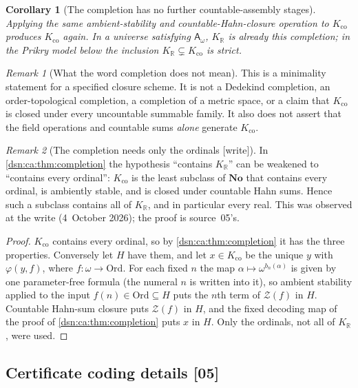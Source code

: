 \documentclass[11pt,a4paper]{article}
\numberwithin{equation}{section}
\newtheorem{corollary}[corollary]{Corollary}
\theoremstyle{definition}
\theoremstyle{remark}
\newtheorem{remark}[remark]{Remark}
\newcommand{\No}{\mathbf{No}}
\newcommand{\Ord}{\mathrm{Ord}}
\newcommand{\R}{\mathbb R}
\newcommand{\src}[1]{\textup{\textsf{\small[#1]}}}
\newcommand{\writetag}{\textup{\textsf{\small[write]}}}
\newcommand{\KR}{K_{\R}}
\newcommand{\Kco}{K_{\mathrm{co}}}
\newcommand{\Asm}{\mathsf A_{\omega}}
\newcommand{\Zc}{\mathcal Z}
\begin{document}
\begin{corollary}[The completion has no further countable-assembly stages]
Applying the same ambient-stability and countable-Hahn-closure operation
to $\Kco$ produces $\Kco$ again. In a universe satisfying $\Asm$,
$\KR$ is already this completion; in the Prikry model below the
inclusion $\KR\subsetneq\Kco$ is strict.
\end{corollary}

\begin{remark}[What the word completion does not mean]
This is a minimality statement for a specified closure scheme. It is
not a Dedekind completion, an order-topological completion, a completion
of a metric space, or a claim that $\Kco$ is closed under every
uncountable summable family. It also does not assert that the field
operations and countable sums \emph{alone} generate $\Kco$.
\end{remark}

\begin{remark}[The completion needs only the ordinals \writetag]
\label{dsn:ca:rem:ordsuffice}
In \cref{dsn:ca:thm:completion} the hypothesis ``contains $\KR$'' can be
weakened to ``contains every ordinal'': $\Kco$ is the least subclass of $\No$
that contains every ordinal, is ambiently stable, and is closed under
countable Hahn sums. Hence such a subclass contains all of $\KR$, and in
particular every real. This was observed at the write (4~October 2026); the
proof is source~05's.
\end{remark}
\begin{proof}
$\Kco$ contains every ordinal, so by \cref{dsn:ca:thm:completion} it has the
three properties. Conversely let $H$ have them, and let $x\in\Kco$ be the
unique $y$ with $\varphi(y,f)$, where $f:\omega\to\Ord$. For each fixed $n$
the map $\alpha\mapsto\omega^{b_n(\alpha)}$ is given by one parameter-free
formula (the numeral $n$ is written into it), so ambient stability applied to
the input $f(n)\in\Ord\subseteq H$ puts the $n$th term of $\Zc(f)$ in $H$.
Countable Hahn-sum closure puts $\Zc(f)$ in $H$, and the fixed decoding map
of the proof of \cref{dsn:ca:thm:completion} puts $x$ in $H$. Only the
ordinals, not all of $\KR$, were used.
\end{proof}

\subsection{Certificate coding details \src{05}}
\label{dsn:ca:app:certificates}
\end{document}
